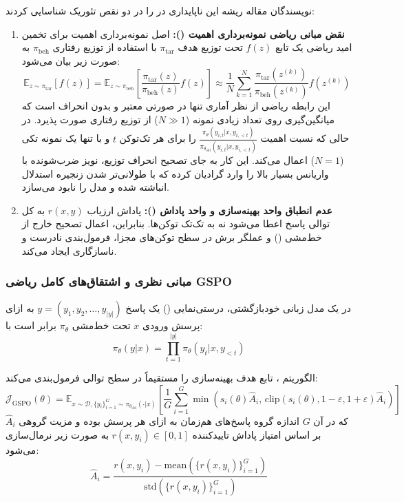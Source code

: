 نویسندگان مقاله  ریشه این ناپایداری در  را در دو نقص تئوریک شناسایی کردند:
\begin{enumerate}
    \item \textbf{نقض مبانی ریاضی نمونه‌برداری اهمیت ():} اصل نمونه‌برداری اهمیت برای تخمین امید ریاضی یک تابع $f(z)$ تحت توزیع هدف $\pi_{\text{tar}}$ با استفاده از توزیع رفتاری $\pi_{\text{beh}}$ به صورت زیر بیان می‌شود:
    \begin{equation}
        \mathbb{E}_{z \sim \pi_{\text{tar}}}[f(z)] = \mathbb{E}_{z \sim \pi_{\text{beh}}}\left[ \frac{\pi_{\text{tar}}(z)}{\pi_{\text{beh}}(z)} f(z) \right] \approx \frac{1}{N} \sum_{k=1}^N \frac{\pi_{\text{tar}}(z^{(k)})}{\pi_{\text{beh}}(z^{(k)})} f(z^{(k)})
    \end{equation}
    این رابطه ریاضی از نظر آماری تنها در صورتی معتبر و بدون انحراف است که میانگین‌گیری روی تعداد زیادی نمونه ($N \gg 1$) از توزیع رفتاری صورت پذیرد. در حالی که  نسبت اهمیت $\frac{\pi_\theta(y_{i,t}|x, y_{i,<t})}{\pi_{\theta_{\text{old}}}(y_{i,t}|x, y_{i,<t})}$ را برای هر تک‌توکن $t$ و با تنها یک نمونه تکی ($N = 1$) اعمال می‌کند. این کار به جای تصحیح انحراف توزیع، نویز ضرب‌شونده با واریانس بسیار بالا را وارد گرادیان کرده که با طولانی‌تر شدن زنجیره استدلال انباشته شده و مدل را نابود می‌سازد.
    \item \textbf{عدم انطباق واحد بهینه‌سازی و واحد پاداش ():} پاداش ارزیاب $r(x, y)$ به کل توالی پاسخ اعطا می‌شود نه به تک‌تک توکن‌ها. بنابراین، اعمال تصحیح خارج از خط‌مشی () و عملگر برش در سطح توکن‌های مجزا، فرمول‌بندی نادرست و ناسازگاری ایجاد می‌کند.
\end{enumerate}

\subsubsection*{مبانی نظری و اشتقاق‌های کامل ریاضی GSPO}

در یک مدل زبانی خودبازگشتی، درستی‌نمایی () یک پاسخ $y = (y_1, y_2, \dots, y_{|y|})$ به ازای پرسش ورودی $x$ تحت خط‌مشی $\pi_\theta$ برابر است با:
\begin{equation}
    \pi_\theta(y|x) = \prod_{t=1}^{|y|} \pi_\theta(y_t | x, y_{<t})
\end{equation}

الگوریتم ، تابع هدف بهینه‌سازی را مستقیماً در سطح توالی فرمول‌بندی می‌کند:
\begin{equation}
    \label{eq:gspo_objective}
    \mathcal{J}_{\text{GSPO}}(\theta) = \mathbb{E}_{x \sim \mathcal{D}, \{y_i\}_{i=1}^G \sim \pi_{\theta_{\text{old}}}(\cdot|x)} \left[ \frac{1}{G} \sum_{i=1}^G \min \left( s_i(\theta) \hat{A}_i, \, \text{clip}(s_i(\theta), 1-\varepsilon, 1+\varepsilon) \hat{A}_i \right) \right]
\end{equation}
که در آن $G$ اندازه گروه پاسخ‌های هم‌زمان به ازای هر پرسش بوده و مزیت گروهی $\hat{A}_i$ بر اساس امتیاز پاداش تاییدکننده $r(x, y_i) \in [0, 1]$ به صورت زیر نرمال‌سازی می‌شود:
\begin{equation}
    \hat{A}_i = \frac{r(x, y_i) - \text{mean}\left(\{r(x, y_i)\}_{i=1}^G\right)}{\text{std}\left(\{r(x, y_i)\}_{i=1}^G\right)}
\end{equation}

